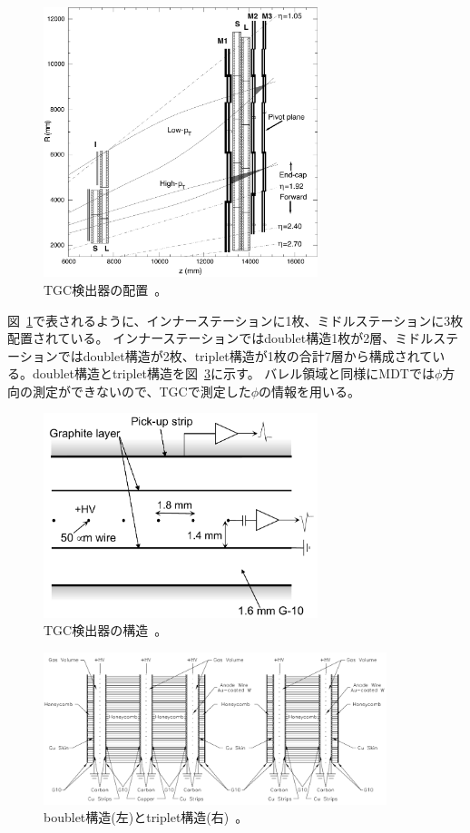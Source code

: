 \begin{figure}[h]
  \centering
  \includegraphics[clip, width=8cm]{fig/2/l1mue-schema.pdf}
  \caption{TGC検出器の配置~\cite{Aad:1129811}。}
  \label{fig:2-20}
\end{figure}

図~\ref{fig:2-20}で表されるように、インナーステーションに1枚、ミドルステーションに3枚配置されている。
インナーステーションではdoublet構造1枚が2層、ミドルステーションではdoublet構造が2枚、triplet構造が1枚の合計7層から構成されている。doublet構造とtriplet構造を図~\ref{fig:2-22}に示す。
バレル領域と同様にMDTでは$\phi$方向の測定ができないので、TGCで測定した$\phi$の情報を用いる。

\begin{figure}[h]
  \centering
  \includegraphics[clip, width=8cm]{fig/2/TGC_anode_wire.pdf}
  \caption{TGC検出器の構造~\cite{Aad:1129811}。}
  \label{fig:2-21}
\end{figure}

\begin{figure}[h]
  \centering
  \includegraphics[clip, width=10cm]{fig/2/TGC_construction.pdf}
  \caption{boublet構造(左)とtriplet構造(右)~\cite{Aad:1129811}。}
  \label{fig:2-22}
\end{figure}


